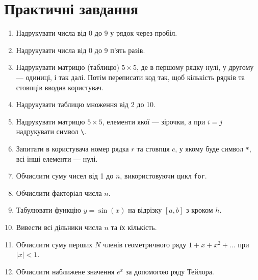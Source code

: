 \section*{Практичні завдання}

\begin{enumerate}
	\item Надрукувати числа від 0 до 9 у рядок через пробіл.
	\item Надрукувати числа від 0 до 9 п'ять разів.
	\item Надрукувати матрицю (таблицю) $5 \times 5$, де в першому рядку нулі, у другому — одиниці, і так далі. 
	Потім переписати код так, щоб кількість рядків та стовпців вводив користувач.
	\item Надрукувати таблицю множення від 2 до 10.
	\item Надрукувати матрицю $5 \times 5$, елементи якої — зірочки, а при $i=j$ надрукувати символ \texttt{\textbackslash}.
	\item Запитати в користувача номер рядка $r$ та стовпця $c$, у якому буде символ \texttt{*}, всі інші елементи — нулі.
	\item Обчислити суму чисел від 1 до $n$, використовуючи цикл \texttt{for}.
	\item Обчислити факторіал числа $n$.
	\item Табулювати функцію $y = \sin(x)$ на відрізку $[a, b]$ з кроком $h$.
	\item Вивести всі дільники числа $n$ та їх кількість.
	\item Обчислити суму перших $N$ членів геометричного ряду $1 + x + x^2 + \dots$ при $|x| < 1$.
	\item Обчислити наближене значення $e^x$ за допомогою ряду Тейлора.
\end{enumerate}


